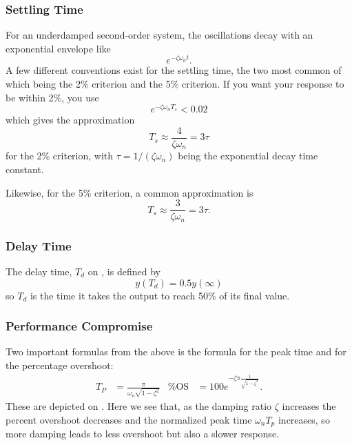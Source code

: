 \subsubsection{Settling Time}
For an underdamped second-order system, the oscillations decay with an exponential envelope like
\begin{equation*}
  e^{-\zeta \omega_n t}
.\end{equation*}
A few different conventions exist for the settling time, the two most common of which being the 2\% criterion and the 5\% criterion.
If you want your response to be within 2\%, you use
\begin{equation*}
  e^{-\zeta \omega_n T_s} < \num{0,02} 
\end{equation*}
which gives the approximation
\begin{equation*}
  T_s \approx \frac{4}{\zeta \omega_n} = 3\tau
\end{equation*}
for the 2\% criterion, with $\tau = 1 / (\zeta \omega_n)$ being the exponential decay time constant.

Likewise, for the 5\% criterion, a common approximation is
\begin{equation*}
  T_s \approx \frac{3}{\zeta \omega_n} = 3 \tau
.\end{equation*}

\subsubsection{Delay Time}
The delay time, $T_d$ on , is defined by
\begin{equation*}
  y(T_d) = \num{0,5} y(\infty)
\end{equation*}
so $T_d$ is the time it takes the output to reach 50\% of its final value. 

\subsubsection{Performance Compromise}
Two important formulas from the above is the formula for the peak time and for the percentage overshoot:
\begin{align*}
  T_P &= \frac{\pi}{\omega_n \sqrt{1 - \zeta^2}} & \%\mathrm{OS} &= 100 e^{-\zeta \pi \frac{1}{\sqrt{1 - \zeta^2}}}
.\end{align*}
These are depicted on .
Here we see that, as the damping ratio $\zeta$ increases the percent overshoot decreases and the normalized peak time $\omega_n T_p$ increases, so more damping leads to less overshoot but also a slower response.

